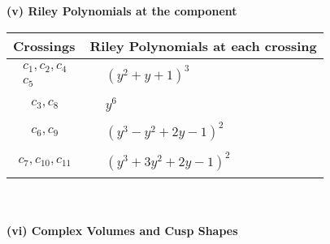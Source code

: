 \documentclass[1p]{elsarticle_modified}
\theoremstyle{definition}
\begin{document}
\newpage\renewcommand{\arraystretch}{1}
\flushleft \textbf{(v) Riley Polynomials at the component}\newline \\
\begin{tabular}{m{50pt}|m{274pt}}
Crossings & \hspace{64pt}Riley Polynomials at each crossing \\
\hline $$\begin{aligned}c_{1},c_{2},c_{4}\\c_{5}\end{aligned}$$&$\begin{aligned}
&(y^2+y+1)^3
\end{aligned}$\\
\hline $$\begin{aligned}c_{3},c_{8}\end{aligned}$$&$\begin{aligned}
&y^6
\end{aligned}$\\
\hline $$\begin{aligned}c_{6},c_{9}\end{aligned}$$&$\begin{aligned}
&(y^3- y^2+2 y-1)^2
\end{aligned}$\\
\hline $$\begin{aligned}c_{7},c_{10},c_{11}\end{aligned}$$&$\begin{aligned}
&(y^3+3 y^2+2 y-1)^2
\end{aligned}$\\
\hline
\end{tabular}\\~\\
\newpage\flushleft \textbf{(vi) Complex Volumes and Cusp Shapes}
\end{document}
